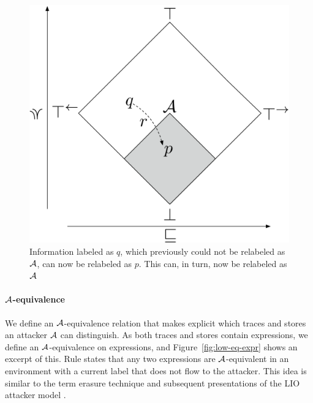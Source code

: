 \begin{figure}
\begin{minipage}{0.5\columnwidth}
\includegraphics[scale=0.20]{Illustrations/bad-flow.pdf}
\end{minipage}%
\begin{minipage}{0.5\columnwidth}
\caption{Information labeled as $q$, which previously could not be relabeled as $\mathcal{A}$, can now be relabeled as $p$. This can, in turn, now be relabeled as $\mathcal{A}$}\label{fig:bad-release}
\end{minipage}
\end{figure}

\paragraph{$\mathcal{A}$-equivalence}
We define an $\mathcal{A}$-equivalence relation that makes explicit which traces and stores an attacker $\mathcal{A}$ can distinguish. As both traces and stores contain expressions, we define an $\mathcal{A}$-equivalence on expressions, and Figure~\ref{fig:low-eq-expr} shows an excerpt of this. Rule  states that any two expressions are $\mathcal{A}$-equivalent in an environment with a current label that does not flow to the attacker. This idea is similar to the term erasure technique \cite{SRMMlio} and subsequent presentations of the LIO attacker model \cite{Stefan:2012:ACT:2364527.2364557, 10.1007/978-3-642-40203-6_40, 10.1007/978-3-319-24858-5_13}.


